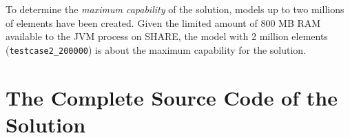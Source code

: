 \documentclass[submission]{eptcs}
\begin{document}
\begin{sloppypar}
  To determine the \emph{maximum capability} of the solution, models up to two
  millions of elements have been created.  Given the limited amount of 800 MB
  RAM available to the JVM process on SHARE, the model with 2 million elements
  (\verb|testcase2_200000|) is about the maximum capability for the solution.
\end{sloppypar}

\FloatBarrier




\appendix
\newpage

\section{The Complete Source Code of the Solution}
\label{sec:complete-source-code}
\end{document}
